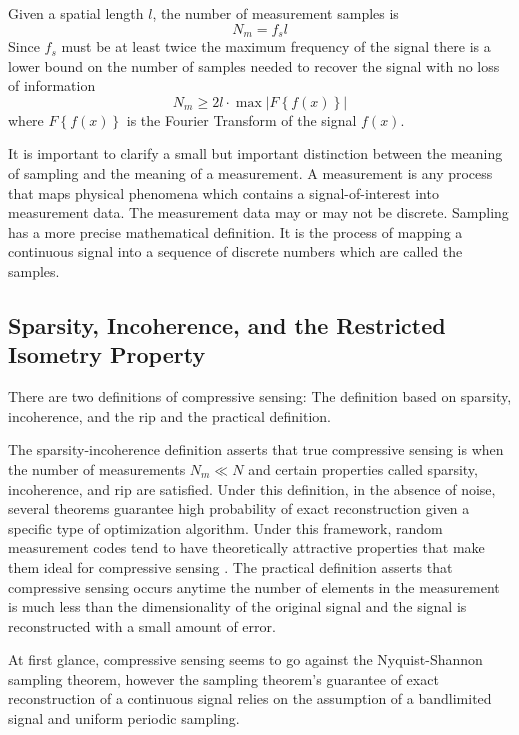 Given a spatial length $l$, the number of measurement samples is
\begin{equation}
	N_m = f_s l
\end{equation}
Since $f_s$ must be at least twice the maximum frequency of the signal there is a lower bound on the number of samples needed to recover the signal with no loss of information
\begin{equation}
	N_m \geq 2 l \cdot \max \left| F\left\{ f\left( x\right) \right\} \right|
\end{equation}
%
where $F\left\{ f\left( x\right) \right\} $ is the Fourier Transform of the signal $f(x)$.

It is important to clarify a small but important distinction between the meaning of \gls{sampling} and the meaning of a \gls{measurement}. A measurement is any process that maps physical phenomena which contains a signal-of-interest into measurement data. The measurement data may or may not be discrete. Sampling has a more precise mathematical definition. It is the process of mapping a continuous signal into a sequence of discrete numbers which are called the samples. 

\subsection{Sparsity, Incoherence, and the Restricted Isometry Property}

There are two definitions of compressive sensing: The definition based on sparsity, incoherence, and the \gls{rip} and the practical definition.

The sparsity-incoherence definition asserts that true compressive sensing is when the number of measurements $N_m \ll N$ and certain properties called sparsity, incoherence, and \gls{rip} are satisfied. Under this definition, in the absence of noise, several theorems guarantee high probability of exact reconstruction given a specific type of optimization algorithm. Under this framework, random measurement codes tend to have theoretically attractive properties that make them ideal for \gls{compressive sensing} \cite{candes2005l1, candes2006robust, foucart2013mathematical, candes2008introduction}. The practical definition asserts that compressive sensing occurs anytime the number of elements in the measurement is much less than the dimensionality of the original signal and the signal is reconstructed with a small amount of error. 

At first glance, \gls{compressive sensing} seems to go against the Nyquist-Shannon sampling theorem, however the sampling theorem's guarantee of exact reconstruction of a continuous signal relies on the assumption of a bandlimited signal and uniform periodic sampling.

